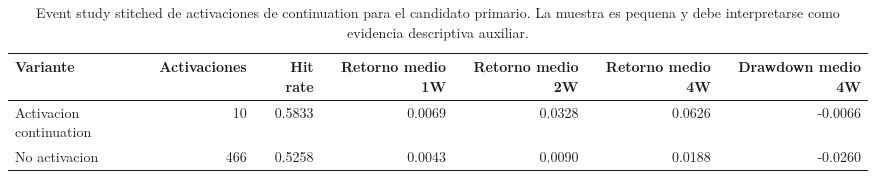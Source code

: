 \begin{table}[H]
\centering
\caption{Event study stitched de activaciones de continuation para el candidato primario. La muestra es pequena y debe interpretarse como evidencia descriptiva auxiliar.}
\label{tab:continuation-event-study}
\begin{tabular}{lrrrrrr}
\toprule
Variante & Activaciones & Hit rate & Retorno medio 1W & Retorno medio 2W & Retorno medio 4W & Drawdown medio 4W \\
\midrule
Activacion continuation & 10 & 0.5833 & 0.0069 & 0.0328 & 0.0626 & -0.0066 \\
No activacion & 466 & 0.5258 & 0.0043 & 0.0090 & 0.0188 & -0.0260 \\
\bottomrule
\end{tabular}
\end{table}
